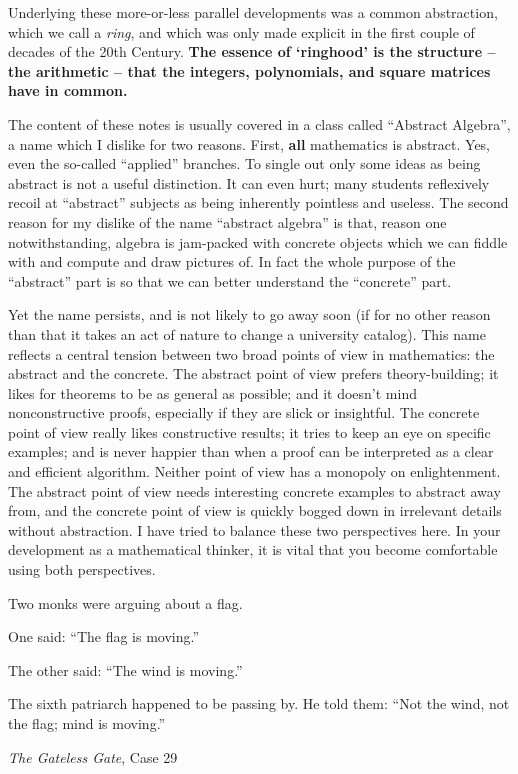 Underlying these more-or-less parallel developments was a common abstraction, which we call a \emph{ring}, and which was only made explicit in the first couple of decades of the 20th Century.
\textbf{The essence of `ringhood' is the structure -- the arithmetic -- that the integers, polynomials, and square matrices have in common.}

The content of these notes is usually covered in a class called ``Abstract Algebra'', a name which I dislike for two reasons.
First, \textbf{all} mathematics is abstract.
Yes, even the so-called ``applied'' branches.
To single out only some ideas as being abstract is not a useful distinction.
It can even hurt; many students reflexively recoil at ``abstract'' subjects as being inherently pointless and useless.
The second reason for my dislike of the name ``abstract algebra'' is that, reason one notwithstanding, algebra is jam-packed with concrete objects which we can fiddle with and compute and draw pictures of.
In fact the whole purpose of the ``abstract'' part is so that we can better understand the ``concrete'' part.

Yet the name persists, and is not likely to go away soon (if for no other reason than that it takes an act of nature to change a university catalog).
This name reflects a central tension between two broad points of view in mathematics: the abstract and the concrete.
The abstract point of view prefers theory-building; it likes for theorems to be as general as possible; and it doesn't mind nonconstructive proofs, especially if they are slick or insightful.
The concrete point of view really likes constructive results; it tries to keep an eye on specific examples; and is never happier than when a proof can be interpreted as a clear and efficient algorithm.
Neither point of view has a monopoly on enlightenment.
The abstract point of view needs interesting concrete examples to abstract away from, and the concrete point of view is quickly bogged down in irrelevant details without abstraction.
I have tried to balance these two perspectives here.
In your development as a mathematical thinker, it is vital that you become comfortable using both perspectives.

\begin{center}
\begin{minipage}{0.7\textwidth}
Two monks were arguing about a flag.

One said: ``The flag is moving.''

The other said: ``The wind is moving.''

The sixth patriarch happened to be passing by. He told them: ``Not the wind, not the flag; mind is moving.''

\hfill \emph{The Gateless Gate}, Case 29
\end{minipage}
\end{center}
